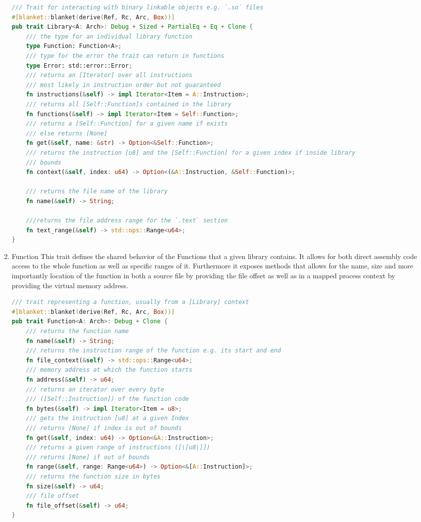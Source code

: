 \begin{enumerate}
\begin{lstlisting}[caption=\label{lst:library}"The Library Trait definition", language=Rust]
/// Trait for interacting with binary linkable objects e.g. `.so` files
#[blanket::blanket(derive(Ref, Rc, Arc, Box))]
pub trait Library<A: Arch>: Debug + Sized + PartialEq + Eq + Clone {
    /// the type for an individual library function
    type Function: Function<A>;
    /// type for the error the trait can return in functions
    type Error: std::error::Error;
    /// returns an [Iterator] over all instructions
    /// most likely in instruction order but not guaranteed
    fn instructions(&self) -> impl Iterator<Item = A::Instruction>;
    /// returns all [Self::Function]s contained in the library
    fn functions(&self) -> impl Iterator<Item = Self::Function>;
    /// returns a [Self::Function] for a given name if exists
    /// else returns [None]
    fn get(&self, name: &str) -> Option<&Self::Function>;
    /// returns the instruction [u8] and the [Self::Function] for a given index if inside library
    /// bounds
    fn context(&self, index: u64) -> Option<(&A::Instruction, &Self::Function)>;

    /// returns the file name of the library
    fn name(&self) -> String;

    ///returns the file address range for the `.text` section
    fn text_range(&self) -> std::ops::Range<u64>;
}
\end{lstlisting}  
    \item \label{reader:function} Function
    This trait defines the shared behavior of the Functions that a given library contains.
    It allows for both direct assembly code access to the whole function as well as specific ranges of it.
    Furthermore it exposes methods that allows for the name, size and more importantly location of the function in both a source file by providing the file offset as well as in a mapped process context by providing the virtual memory address.

\begin{lstlisting}[caption=\label{lst:function}"The Function Trait definition", language=Rust]
/// trait representing a function, usually from a [Library] context
#[blanket::blanket(derive(Ref, Rc, Arc, Box))]
pub trait Function<A: Arch>: Debug + Clone {
    /// returns the function name
    fn name(&self) -> String;
    /// returns the instruction range of the function e.g. its start and end
    fn file_context(&self) -> std::ops::Range<u64>;
    /// memory address at which the function starts
    fn address(&self) -> u64;
    /// returns an iterator over every byte 
    /// ([Self::Instruction]) of the function code
    fn bytes(&self) -> impl Iterator<Item = u8>;
    /// gets the instruction [u8] at a given Index
    /// returns [None] if index is out of bounds
    fn get(&self, index: u64) -> Option<&A::Instruction>;
    /// returns a given range of instructions ([\[u8\]])
    /// returns [None] if out of bounds
    fn range(&self, range: Range<u64>) -> Option<&[A::Instruction]>;
    /// returns the function size in bytes
    fn size(&self) -> u64;
    /// file offset
    fn file_offset(&self) -> u64;
}
\end{lstlisting}
    

\end{enumerate}
